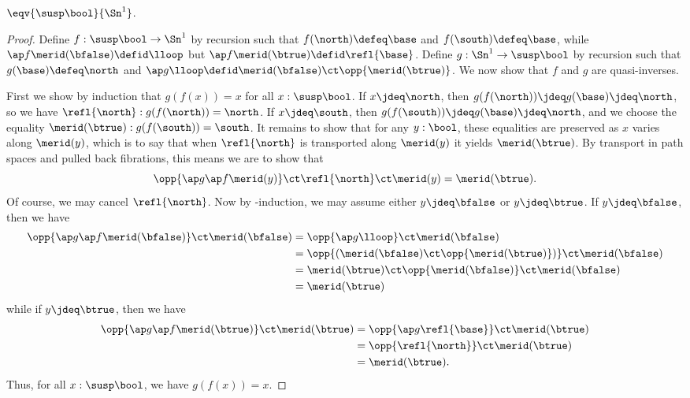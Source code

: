 %
\begin{lem}\label{thm:suspbool}
  $\eqv{\susp\bool}{\Sn^1}$.
\end{lem}

\begin{proof}
  Define $f:\susp\bool\to\Sn^1$ by recursion such that $f(\north)\defeq \base$ and $f(\south)\defeq\base$, while $\ap f{\merid(\bfalse)}\defid\lloop$ but $\ap f{\merid(\btrue)} \defid \refl{\base}$.
  Define $g:\Sn^1\to\susp\bool$ by recursion such that $g(\base)\defeq \north$ and $\ap g \lloop \defid \merid(\bfalse) \ct \opp{\merid(\btrue)}$.
  We now show that $f$ and $g$ are quasi-inverses.

  First we show by induction that $g(f(x))=x$ for all $x:\susp \bool$.
  If $x\jdeq\north$, then $g(f(\north)) \jdeq g(\base)\jdeq \north$, so we have $\refl{\north} : g(f(\north))=\north$.
  If $x\jdeq\south$, then $g(f(\south)) \jdeq g(\base)\jdeq \north$, and we choose the equality $\merid(\btrue) : g(f(\south)) = \south$.
  It remains to show that for any $y:\bool$, these equalities are preserved as $x$ varies along $\merid(y)$, which is to say that when $\refl{\north}$ is transported along $\merid(y)$ it yields $\merid(\btrue)$.
  By transport in path spaces and pulled back fibrations, this means we are to show that
  \[ \opp{\ap g {\ap f {\merid(y)}}} \ct \refl{\north} \ct \merid(y) = \merid(\btrue). \]
  Of course, we may cancel $\refl{\north}$.
  Now by \bool-induction, we may assume either $y\jdeq \bfalse$ or $y\jdeq \btrue$.
  If $y\jdeq \bfalse$, then we have
  \begin{align*}
    \opp{\ap g {\ap f {\merid(\bfalse)}}} \ct \merid(\bfalse)
    &= \opp{\ap g {\lloop}} \ct \merid(\bfalse)\\
    &= \opp{(\merid(\bfalse) \ct \opp{\merid(\btrue)})} \ct \merid(\bfalse)\\
    &= \merid(\btrue) \ct \opp{\merid(\bfalse)} \ct \merid(\bfalse)\\
    &= \merid(\btrue)
  \end{align*}
  while if $y\jdeq \btrue$, then we have
  \begin{align*}
    \opp{\ap g {\ap f {\merid(\btrue)}}} \ct \merid(\btrue)
    &= \opp{\ap g {\refl{\base}}} \ct \merid(\btrue)\\
    &= \opp{\refl{\north}} \ct \merid(\btrue)\\
    &= \merid(\btrue).
  \end{align*}
  Thus, for all $x:\susp \bool$, we have $g(f(x))=x$.


\end{proof}
